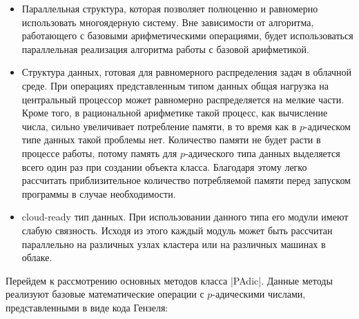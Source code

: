 \documentclass[master, och, times, pract]{sty/SCWorks}
\theoremstyle{plain}
\theoremstyle{definition}
\numberwithin{equation}{section}
\begin{document}
\begin{itemize}
\item Параллельная структура, которая позволяет полноценно и равномерно использовать многоядерную систему. Вне зависимости от алгоритма, работающего с базовыми арифметическими операциями, будет использоваться параллельная реализация алгоритма работы с базовой арифметикой.
\item Структура данных, готовая для равномерного распределения задач в облачной среде. При операциях представленным типом данных общая нагрузка на центральный процессор может равномерно распределяется на мелкие части. Кроме того, в рациональной арифметике такой процесс, как вычисление числа, сильно увеличивает потребление памяти, в то время как в $p$-адическом типе данных такой проблемы нет. Количество памяти не будет расти в процессе работы, потому память для $p$-адического типа данных выделяется всего один раз при создании объекта класса. Благодаря этому легко рассчитать приблизительное количество потребляемой памяти перед запуском программы в случае необходимости.
\item cloud-ready тип данных. При использовании данного типа его модули имеют слабую связность. Исходя из этого каждый модуль может быть рассчитан параллельно на различных узлах кластера или на различных машинах в облаке.
\end{itemize}

Перейдем к рассмотрению основных методов класса |PAdic|. Данные методы реализуют базовые математические операции с $p$-адическими числами, представленными в виде кода Гензеля:
\end{document}
